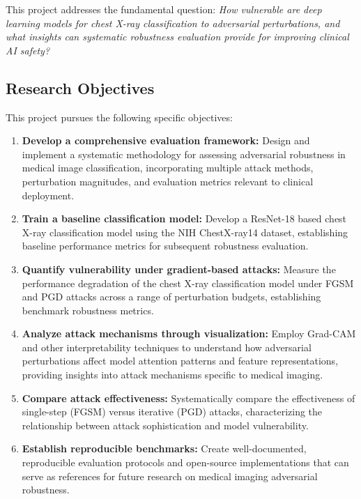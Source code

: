 \documentclass[12pt,a4paper]{article}
\begin{document}
This project addresses the fundamental question: \textit{How vulnerable are deep learning models for chest X-ray classification to adversarial perturbations, and what insights can systematic robustness evaluation provide for improving clinical AI safety?}

\subsection{Research Objectives}

This project pursues the following specific objectives:

\begin{enumerate}[leftmargin=*]
    \item \textbf{Develop a comprehensive evaluation framework:} Design and implement a systematic methodology for assessing adversarial robustness in medical image classification, incorporating multiple attack methods, perturbation magnitudes, and evaluation metrics relevant to clinical deployment.
    
    \item \textbf{Train a baseline classification model:} Develop a ResNet-18 based chest X-ray classification model using the NIH ChestX-ray14 dataset, establishing baseline performance metrics for subsequent robustness evaluation.
    
    \item \textbf{Quantify vulnerability under gradient-based attacks:} Measure the performance degradation of the chest X-ray classification model under FGSM and PGD attacks across a range of perturbation budgets, establishing benchmark robustness metrics.
    
    \item \textbf{Analyze attack mechanisms through visualization:} Employ Grad-CAM and other interpretability techniques to understand how adversarial perturbations affect model attention patterns and feature representations, providing insights into attack mechanisms specific to medical imaging.
    
    \item \textbf{Compare attack effectiveness:} Systematically compare the effectiveness of single-step (FGSM) versus iterative (PGD) attacks, characterizing the relationship between attack sophistication and model vulnerability.
    
    \item \textbf{Establish reproducible benchmarks:} Create well-documented, reproducible evaluation protocols and open-source implementations that can serve as references for future research on medical imaging adversarial robustness.
\end{enumerate}
\end{document}
